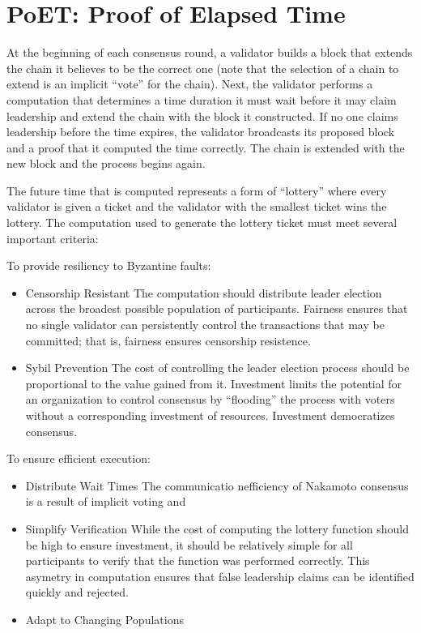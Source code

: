 \section{PoET: Proof of Elapsed Time}
\label{sec_poet}


At the beginning of each consensus round, a validator builds a block that extends the chain it believes to be the
correct one (note that the selection of a chain to extend is an implicit ``vote'' for the chain). Next, the validator
performs a computation that determines a time duration it must wait before it may claim leadership and extend the chain
with the block it constructed. If no one claims leadership before the time expires, the validator broadcasts
its proposed block and a proof that it computed the time correctly. The chain is extended with the new block and the
process begins again. 

The future time that is computed represents a form of ``lottery'' where every validator is given a ticket and the
validator with the smallest ticket wins the lottery. The computation used to generate the lottery ticket must meet
several important criteria:

To provide resiliency to Byzantine faults:
\begin{itemize}
\item Censorship Resistant
  The computation should distribute leader election across the broadest possible population of participants. Fairness
  ensures that no single validator can persistently control the transactions that may be committed; that is, fairness
  ensures censorship resistence.

\item Sybil Prevention
  The cost of controlling the leader election process should be proportional to the value gained from it. Investment
  limits the potential for an organization to control consensus by ``flooding'' the process with voters without a
  corresponding investment of resources. Investment democratizes consensus. 
\end{itemize}

To ensure efficient execution:
\begin{itemize}
\item Distribute Wait Times
  The communicatio nefficiency of Nakamoto consensus is a result of implicit voting and 

\item Simplify Verification
  While the cost of computing the lottery function should be high to ensure investment, it should be relatively simple
  for all participants to verify that the function was performed correctly. This asymetry in computation ensures that
  false leadership claims can be identified quickly and rejected.

\item Adapt to Changing Populations

\end{itemize}




